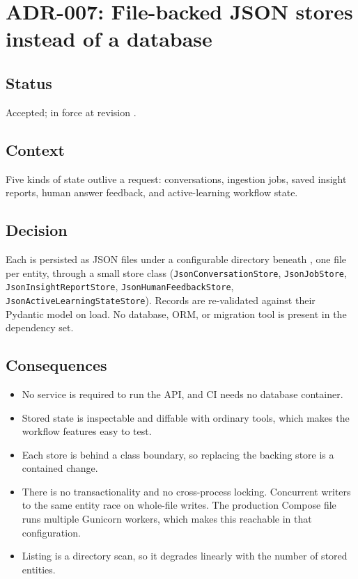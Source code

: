 \section{ADR-007: File-backed JSON stores instead of a database}
\label{adr:007}

\subsection*{Status}

Accepted; in force at revision \texttt{\projectrevisionshort}.

\subsection*{Context}

Five kinds of state outlive a request: conversations, ingestion jobs, saved
insight reports, human answer feedback, and active-learning workflow state.

\subsection*{Decision}

Each is persisted as JSON files under a configurable directory beneath
, one file per entity, through a small store class
(\texttt{JsonConversationStore}, \texttt{JsonJobStore},
\texttt{JsonInsightReportStore}, \texttt{JsonHumanFeedbackStore},
\texttt{JsonActiveLearningStateStore}). Records are re-validated against their
Pydantic model on load. No database, ORM, or migration tool is present in the
dependency set.

\subsection*{Consequences}

\begin{itemize}
  \item No service is required to run the API, and CI needs no database
    container.
  \item Stored state is inspectable and diffable with ordinary tools, which
    makes the workflow features easy to test.
  \item Each store is behind a class boundary, so replacing the backing store
    is a contained change.
  \item There is no transactionality and no cross-process locking. Concurrent
    writers to the same entity race on whole-file writes. The production
    Compose file runs multiple Gunicorn workers, which makes this reachable in
    that configuration.
  \item Listing is a directory scan, so it degrades linearly with the number of
    stored entities.
\end{itemize}

